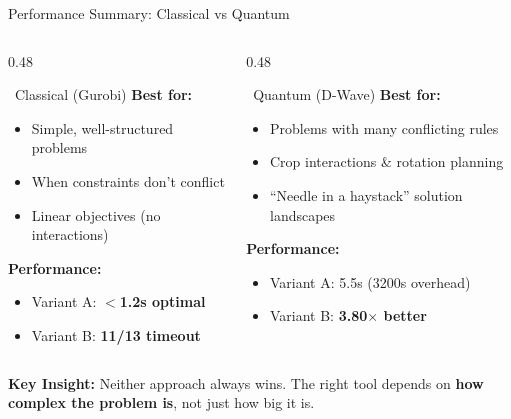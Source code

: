 \documentclass[aspectratio=169,10pt]{beamer}
\begin{document}
\begin{frame}{Performance Summary: Classical vs Quantum}
\vspace{-0.5cm}
\small
\begin{columns}[T]
\begin{column}{0.48\textwidth}
\begin{block}{\faDesktop\ Classical (Gurobi)}
\textbf{Best for:}
\begin{itemize}
    \item Simple, well-structured problems
    \item When constraints don't conflict
    \item Linear objectives (no interactions)
\end{itemize}

\textbf{Performance:}
\begin{itemize}
    \item Variant A: \textcolor{accentGreen}{\textbf{$<$1.2s optimal}}
    \item Variant B: \textcolor{alertRed}{\textbf{11/13 timeout}}
\end{itemize}
\end{block}
\end{column}
\begin{column}{0.48\textwidth}
\begin{block}{\faAtom\ Quantum (D-Wave)}
\textbf{Best for:}
\begin{itemize}
    \item Problems with many conflicting rules
    \item Crop interactions \& rotation planning
    \item ``Needle in a haystack'' solution landscapes
\end{itemize}

\textbf{Performance:}
\begin{itemize}
    \item Variant A: \textcolor{warmOrange}{5.5s (3200s overhead)}
    \item Variant B: \textcolor{accentGreen}{\textbf{3.80$\times$ better}}
\end{itemize}
\end{block}
\end{column}
\end{columns}
\vspace{0.1cm}
\begin{keybox}
\centering
\small\textbf{Key Insight:} Neither approach always wins. The right tool depends on \textbf{how complex the problem is}, not just how big it is.
\end{keybox}
\end{frame}
\end{document}
